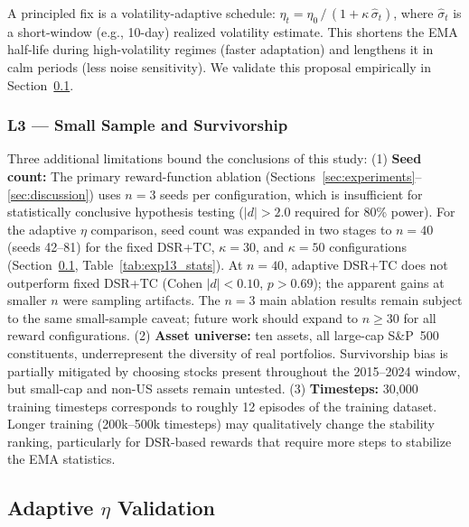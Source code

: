 \documentclass[conference]{IEEEtran}
\begin{document}
A principled fix is a volatility-adaptive schedule:
$\eta_t = \eta_0 \,/\, (1 + \kappa\,\hat{\sigma}_t)$,
where $\hat{\sigma}_t$ is a short-window (e.g., 10-day) realized
volatility estimate. This shortens the EMA half-life during
high-volatility regimes (faster adaptation) and lengthens it in
calm periods (less noise sensitivity). We validate this proposal
empirically in Section~\ref{subsec:adaptive_eta}.

\subsubsection{L3 --- Small Sample and Survivorship}

Three additional limitations bound the conclusions of this study:
(1) \textbf{Seed count:} The primary reward-function ablation
(Sections~\ref{sec:experiments}--\ref{sec:discussion}) uses $n=3$
seeds per configuration, which is insufficient for statistically
conclusive hypothesis testing ($|d|>2.0$ required for 80\% power).
For the adaptive $\eta$ comparison, seed count was expanded in two
stages to $n=40$ (seeds 42--81) for the fixed DSR+TC, $\kappa=30$,
and $\kappa=50$ configurations (Section~\ref{subsec:adaptive_eta},
Table~\ref{tab:exp13_stats}). At $n=40$, adaptive DSR+TC does not
outperform fixed DSR+TC (Cohen $|d|<0.10$, $p>0.69$); the apparent
gains at smaller $n$ were sampling artifacts. The $n=3$ main ablation
results remain subject to the same small-sample caveat; future work
should expand to $n\geq30$ for all reward configurations.
(2) \textbf{Asset universe:} ten assets, all large-cap S\&P~500
constituents, underrepresent the diversity of real portfolios.
Survivorship bias is partially mitigated by choosing stocks
present throughout the 2015--2024 window, but small-cap and
non-US assets remain untested.
(3) \textbf{Timesteps:} 30,000 training timesteps corresponds to
roughly 12 episodes of the training dataset. Longer training
(200k--500k timesteps) may qualitatively change the stability
ranking, particularly for DSR-based rewards that require more
steps to stabilize the EMA statistics.

\subsection{Adaptive $\eta$ Validation}
\label{subsec:adaptive_eta}
\end{document}

